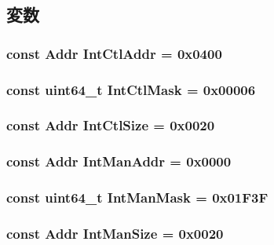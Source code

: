 \subsection{変数}
\hypertarget{iob_8hh_a056f1d0f44791f82cac5fd3964a53c57}{
\subsubsection[{IntCtlAddr}]{\setlength{\rightskip}{0pt plus 5cm}const {\bf Addr} {\bf IntCtlAddr} = 0x0400}}
\label{iob_8hh_a056f1d0f44791f82cac5fd3964a53c57}
\hypertarget{iob_8hh_a9ebd85074fdd9cc9a5a6079c0a218822}{
\subsubsection[{IntCtlMask}]{\setlength{\rightskip}{0pt plus 5cm}const uint64\_\-t {\bf IntCtlMask} = 0x00006}}
\label{iob_8hh_a9ebd85074fdd9cc9a5a6079c0a218822}
\hypertarget{iob_8hh_a3274bf1642cc20d550bb8cb53ed2246f}{
\subsubsection[{IntCtlSize}]{\setlength{\rightskip}{0pt plus 5cm}const {\bf Addr} {\bf IntCtlSize} = 0x0020}}
\label{iob_8hh_a3274bf1642cc20d550bb8cb53ed2246f}
\hypertarget{iob_8hh_a95d5a4a7387bdf8a1d63c371043775af}{
\subsubsection[{IntManAddr}]{\setlength{\rightskip}{0pt plus 5cm}const {\bf Addr} {\bf IntManAddr} = 0x0000}}
\label{iob_8hh_a95d5a4a7387bdf8a1d63c371043775af}
\hypertarget{iob_8hh_ac172e68b1100862061270a74ce63a527}{
\subsubsection[{IntManMask}]{\setlength{\rightskip}{0pt plus 5cm}const uint64\_\-t {\bf IntManMask} = 0x01F3F}}
\label{iob_8hh_ac172e68b1100862061270a74ce63a527}
\hypertarget{iob_8hh_a5419690cae16575305ae94e77c2c8759}{
\subsubsection[{IntManSize}]{\setlength{\rightskip}{0pt plus 5cm}const {\bf Addr} {\bf IntManSize} = 0x0020}}
